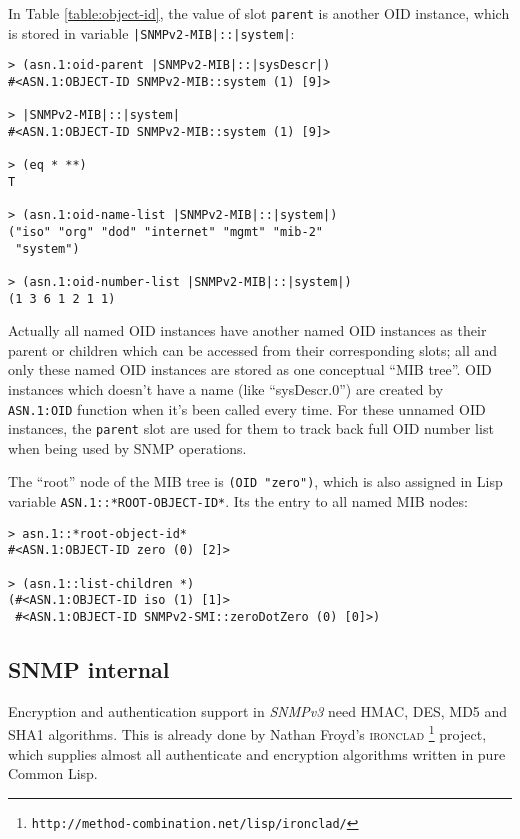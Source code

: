 \documentclass[reprint,9pt]{sigplanconf}
\begin{document}
In Table \ref{table:object-id}, the value of slot \texttt{parent}
is another OID instance, which is stored in variable
\texttt{|SNMPv2-MIB|::|system|}:

\begin{verbatim}
> (asn.1:oid-parent |SNMPv2-MIB|::|sysDescr|)
#<ASN.1:OBJECT-ID SNMPv2-MIB::system (1) [9]>

> |SNMPv2-MIB|::|system|
#<ASN.1:OBJECT-ID SNMPv2-MIB::system (1) [9]>

> (eq * **)
T

> (asn.1:oid-name-list |SNMPv2-MIB|::|system|)
("iso" "org" "dod" "internet" "mgmt" "mib-2"
 "system")

> (asn.1:oid-number-list |SNMPv2-MIB|::|system|)
(1 3 6 1 2 1 1)
\end{verbatim}

Actually all named OID instances have another
named OID instances as their parent or children which can be
accessed from their corresponding slots; all and only these named
OID instances are stored as one conceptual ``MIB tree''.
OID instances which doesn't have a name (like
``sysDescr.0'') are created by \texttt{ASN.1:OID} function when it's been called every time. For these unnamed OID instances, the \texttt{parent} slot are
used for them to track back full OID number list when being used by SNMP operations.

The ``root'' node of the MIB tree is \texttt{(OID "zero")}, which
is also assigned in Lisp variable \texttt{ASN.1::*ROOT-OBJECT-ID*}.
Its the entry to all named MIB nodes:

\begin{verbatim}
> asn.1::*root-object-id*
#<ASN.1:OBJECT-ID zero (0) [2]>

> (asn.1::list-children *)
(#<ASN.1:OBJECT-ID iso (1) [1]>
 #<ASN.1:OBJECT-ID SNMPv2-SMI::zeroDotZero (0) [0]>)
\end{verbatim}

\subsection{SNMP internal}

Encryption and authentication support in \textsl{SNMPv3} need HMAC,
DES, MD5 and SHA1 algorithms. This is already done by Nathan Froyd's \textsc{ironclad}%
\footnote{\texttt{http://method-combination.net/lisp/ironclad/}}
project, which supplies almost all authenticate and encryption
algorithms written in pure Common Lisp.
\end{document}
